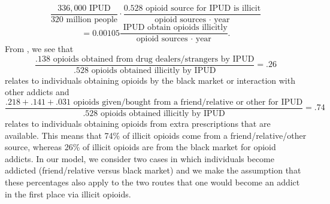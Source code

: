 \documentclass[12pt]{article}
\begin{document}
$$\frac{336,000\text { IPUD}}{320 \text{ million people}}\cdot \frac{0.528 \text{ opioid source for IPUD is illicit}}{\text{opioid sources $\cdot$ year}}$$
$$=0.00105 \frac{ \text { IPUD obtain opioids illicitly}}{{\text{opioid sources $\cdot$ year}}}.$$
From \cite{Han}, we see that \\
$$\frac{.138 \text{ opioids obtained from drug dealers/strangers by IPUD}}{.528 \text{ opioids obtained illicitly by IPUD}}=.26$$ 
relates to individuals obtaining opioids by the black market or interaction with other addicts and
$$\frac{.218+.141+.031 \text{ opioids given/bought from a friend/relative or other for IPUD}}{.528 \text{ opioids obtained illicitly by IPUD}}=.74$$ 
relates to individuals obtaining opioids from extra prescriptions that are available. This means that 74\% of illicit opioids come from a friend/relative/other source, whereas 26\% of illicit opioids are from the black market for opioid addicts. In our model, we consider two cases in which individuals become addicted (friend/relative versus black market) and we make the assumption that these percentages also apply to the two routes that one would become an addict in the first place via illicit opioids. 
\end{document}

